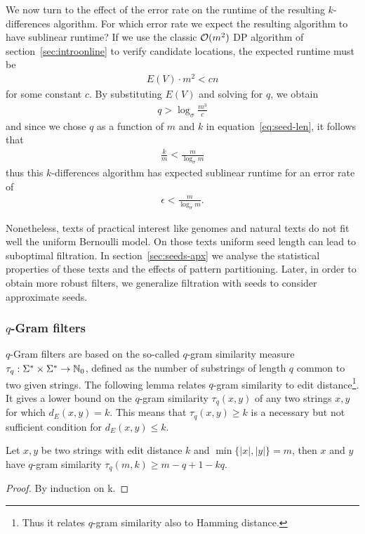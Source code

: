 We now turn to the effect of the error rate on the runtime of the resulting $k$-differences algorithm.
For which error rate we expect the resulting algorithm to have sublinear runtime?
If we use the classic $\mathcal{O}(m^2)$ DP algorithm of section~\ref{sec:introonline} to verify candidate locations, the expected runtime must be
\begin{eqnarray}
E(V) \cdot m^2 < cn
\end{eqnarray}
for some constant $c$.
By substituting $E(V)$ and solving for $q$, we obtain
\begin{eqnarray}
q > \log_{\sigma}{\frac{m^3}{c}}
\end{eqnarray}
and since we chose $q$ as a function of $m$ and $k$ in equation~\ref{eq:seed-len}, it follows that
\begin{eqnarray}
\frac{k}{m} < \frac{m}{\log_{\sigma}{m}}
\end{eqnarray}
thus this $k$-differences algorithm has expected sublinear runtime for an error rate of
\begin{eqnarray}
\epsilon < \frac{m}{\log_{\sigma}{m}}.
\end{eqnarray}

Nonetheless, texts of practical interest like genomes and natural texts do not fit well the uniform Bernoulli model.
On those texts uniform seed length can lead to suboptimal filtration.
In section~\ref{sec:seeds-apx} we analyse the statistical properties of these texts and the effects of pattern partitioning.
Later, in order to obtain more robust filters, we generalize filtration with seeds to consider approximate seeds.

\subsubsection{$q$-Gram filters}

$q$-Gram filters are based on the so-called $q$-gram similarity measure $\tau_q : \Sigma^{*} \times \Sigma^{*} \rightarrow \mathbb {N}_0$, defined as the number of substrings of length $q$ common to two given strings.
The following lemma relates $q$-gram similarity to edit distance\footnote{Thus it relates $q$-gram similarity also to Hamming distance.}.
It gives a lower bound on the $q$-gram similarity $\tau_q(x,y)$ of any two strings $x,y$ for which $d_E(x,y) = k$.
This means that $\tau_q(x,y) \geq k$ is a necessary but not sufficient condition for $d_E(x,y) \leq k$.
\begin{lemma}
\label{lemma:qgrams}
\citep{?}
Let $x,y$ be two strings with edit distance $k$ and $\min\{|x|,|y|\} = m$, then $x$ and $y$ have $q$-gram similarity $\tau_q(m,k) \geq m - q + 1 - kq$.
\end{lemma}
\begin{proof}
By induction on k.
\end{proof}

